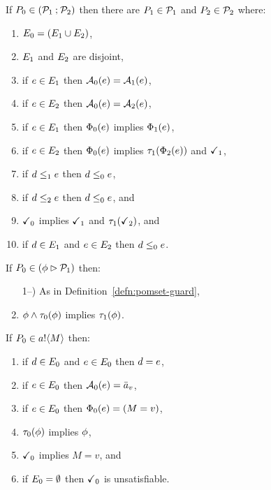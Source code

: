 \begin{definition}
  If $P_0 \in (\mathcal{P}_1\mathbin{;}\mathcal{P}_2)$ then
  there are $P_1\in\mathcal{P}_1$ and $P_2\in\mathcal{P}_2$ where:
  \begin{enumerate}
  \item $E_0 = (E_1\cup E_2)$,
  \item $E_1$ and  $E_2$ are disjoint,
  \item if $e\in E_1$ then $\mathcal{A}_0(e) = \mathcal{A}_1(e)$, 
  \item if $e\in E_2$ then $\mathcal{A}_0(e) = \mathcal{A}_2(e)$,
  \item if $e\in E_1$ then $\Phi_0(e)$ implies $\Phi_1(e)$, 
  \item if $e\in E_2$ then $\Phi_0(e)$ implies $\tau_1(\Phi_2(e))$ and $\checkmark_1$,
  \item if $d\le_1e$ then $d\le_0e$,
  \item if $d\le_2e$ then $d\le_0e$, and
  \item $\checkmark_0$ implies $\checkmark_1$ and $\tau_1(\checkmark_2)$, and
  \item if $d\in E_1$ and $e\in E_2$ then $d\le_0e$.
  \end{enumerate}
\end{definition}

\begin{definition}
  If $P_0 \in (\phi\mathbin\rhd\mathcal{P}_1)$ then:
  \begin{enumerate}
    \setcounter{enumi}{\value{pomsetGuardCount}}
  \item[1--\thepomsetGuardCount)] As in Definition~\ref{defn:pomset-guard},
  \item $\phi\land\tau_0(\phi)$ implies $\tau_1(\phi)$.
  \end{enumerate}
\end{definition}

\begin{definition}
  If $\aPS_0 \in \sSEND\aChan{\aExp}$ then:
  \begin{enumerate}
  \item if $d\in E_0$ and $e\in E_0$ then $d=e$,
  \item if $e\in E_0$ then $\mathcal{A}_0(e) = \bar{a}_{v}$,
  \item if $e\in E_0$ then $\Phi_0(e) = (M = v)$,
  \item $\tau_0(\phi)$ implies $\phi$,
  \item $\checkmark_0$ implies $M = v$, and
  \item if $E_0=\emptyset$ then $\checkmark_0$ is unsatisfiable.
  \end{enumerate}
\end{definition}

